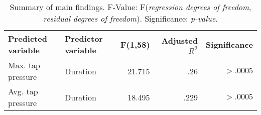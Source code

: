 \begin{table}[ht]
\centering
\begin{tabular}{@{}llrrr@{}}
\textbf{Predicted variable} & \textbf{Predictor variable} & \textbf{F(1,58)} & \textbf{Adjusted $R^2$} & \textbf{Significance} \\ \midrule
Max. tap pressure           & Duration                    & 21.715           & .26                     & $> .0005$             \\
Avg. tap pressure           & Duration                    & 18.495           & .229                    & $> .0005$            
\end{tabular}
\caption{Summary of main findings. F-Value: F(\textit{regression degrees of freedom}, \textit{residual degrees of freedom}). Significance: \textit{p-value}.}
\label{tab:secondary_findings}
\end{table}